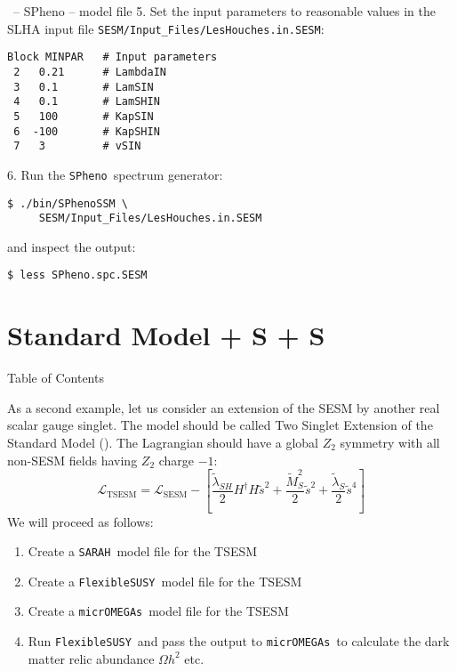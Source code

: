 \documentclass[11pt]{beamer}
\newcommand{\FlexibleSUSY}{\texttt{FlexibleSUSY}}
\newcommand{\Lagr}{\mathcal{L}}
\newcommand{\micrOMEGAs}{\texttt{micrOMEGAs}}
\newcommand{\SARAH}{\texttt{SARAH}}
\newcommand{\SESM}{\text{SESM}}
\newcommand{\SPheno}{\texttt{SPheno}}
\newcommand{\TSESM}{\text{TSESM}}
\begin{document}

\begin{frame}[fragile]{\insertsection\ -- SPheno -- model file}
  5. Set the input parameters to reasonable values in the SLHA input
  file \texttt{SESM/Input\_Files/LesHouches.in.SESM}:
  \begin{lstlisting}
Block MINPAR   # Input parameters 
 2   0.21      # LambdaIN
 3   0.1       # LamSIN
 4   0.1       # LamSHIN
 5   100       # KapSIN
 6  -100       # KapSHIN
 7   3         # vSIN\end{lstlisting}%
  6. Run the \SPheno\ spectrum generator:
  \begin{lstlisting}
$ ./bin/SPhenoSSM \
     SESM/Input_Files/LesHouches.in.SESM\end{lstlisting}%
  and inspect the output:
  \begin{lstlisting}
$ less SPheno.spc.SESM\end{lstlisting}%
\end{frame}


\section{Standard Model + S + S}


\begin{frame}{Table of Contents}
  \tableofcontents[currentsection]
\end{frame}


\begin{frame}{\insertsection}
  As a second example, let us consider an extension of the SESM by
  another real scalar gauge singlet. The model should be called Two
  Singlet Extension of the Standard Model (\TSESM). The Lagrangian
  should have a global $Z_2$ symmetry with all non-SESM fields having
  $Z_2$ charge $-1$:
  \begin{equation*}
    \Lagr_{\TSESM} = \Lagr_{\SESM} - \left[\frac{\tilde\lambda_{SH}}{2} H^\dagger H \tilde{s}^2 + \frac{\tilde{M}_S^2}{2} \tilde{s}^2 + \frac{\tilde{\lambda}_S}{2} \tilde{s}^4\right]
  \end{equation*}
  We will proceed as follows:
  \begin{enumerate}
  \item Create a \SARAH\ model file for the TSESM
  \item Create a \FlexibleSUSY\ model file for the TSESM
  \item Create a \micrOMEGAs\ model file for the TSESM
  \item Run \FlexibleSUSY\ and pass the output to \micrOMEGAs\ to
    calculate the dark matter relic abundance $\Omega h^2$ etc.
  \end{enumerate}
\end{frame}
\end{document}

